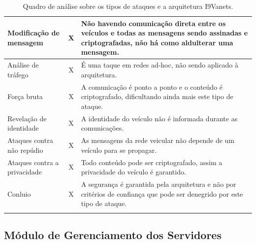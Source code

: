\documentclass[
	12pt,				%
	oneside,			%
	a4paper,			%
	english,			%
	brazil				%
	]{abntex2ppgsi}
\begin{document}
\begin{longtable}{|l|c| p{}|}
		Modificação de mensagem	&  X  & Não havendo comunicação direta entre os veículos e todas as mensagens sendo assinadas e criptografadas, não há como aldulterar uma mensagem. \\ \hline
		Análise de tráfego	&  X & É uma taque em redes ad-hoc, não sendo aplicado à arquitetura. \\ \hline
		Força bruta	&  X & A comunicação é ponto a ponto e o conteúdo é criptografado, dificultando ainda mais este tipo de ataque.\\ \hline
		Revelação de identidade	&  X & A identidade do veículo não é informada durante as comunicações.\\ \hline
		Ataques contra não repúdio	&  X & As mensagens da rede veicular não depende de um veículo para se propagar. \\ \hline
		Ataques contra a privacidade &  X & Todo conteúdo pode ser criptografado, assim a privacidade do veículo é garantido. \\ \hline
		Conluio	&  X & A segurança é garantida pela arquitetura e não por critérios de confiança que pode ser denegrido por este tipo de ataque. \\ \hline
	\caption{Quadro de análise sobre os tipos de ataques e a arquitetura I9Vanets.} 
	\label{tab:I9VanetSeguranca}
\end{longtable}

\subsection{Módulo de Gerenciamento dos Servidores}

\end{document}
